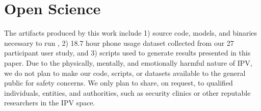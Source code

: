 \section*{Open Science}

The artifacts produced by this work include 1) source code, models, and binaries necessary to run \sys, 2) 18.7 hour phone usage dataset collected from our 27 participant user study, and 3) scripts used to generate results presented in this paper. Due to the physically, mentally, and emotionally harmful nature of IPV, we do not plan to make our code, scripts, or datasets available to the general public for safety concerns. We only plan to share, on request, to qualified individuals, entities, and authorities, such as security clinics or other reputable researchers in the IPV space.

